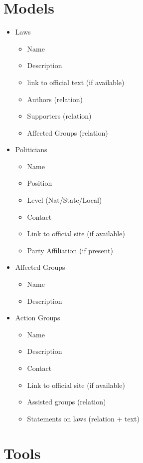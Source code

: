 \documentclass[12pt]{article}
\begin{document}
\section{Models}

\begin{itemize}
	\item[] Laws
	\begin{itemize}
		\item Name
		\item Description
		\item link to official text (if available)
		\item Authors (relation)
		\item Supporters (relation)
		\item Affected Groups (relation)
	\end{itemize}
	\item[] Politicians
	\begin{itemize}
		\item Name
		\item Position
		\item Level (Nat/State/Local)
		\item Contact
		\item Link to official site (if available)
		\item Party Affiliation (if present)
	\end{itemize}
	\item[] Affected Groups
	\begin{itemize}
		\item Name
		\item Description
	\end{itemize}
	\item[] Action Groups
	\begin{itemize}
		\item Name
		\item Description
		\item Contact
		\item Link to official site (if available)
		\item Assisted groups (relation)
		\item Statements on laws (relation + text)
	\end{itemize}
\end{itemize}

\section{Tools}
\end{document}
